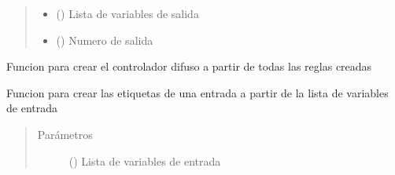 \documentclass[letterpaper,10pt,spanish]{sphinxmanual}
\begin{document}
\begin{fulllineitems}
\begin{fulllineitems}
\begin{quote}
\begin{description}
\begin{itemize}
\item {} 
 () \textendash{} Lista de variables de salida

\item {} 
 () \textendash{} Numero de salida

\end{itemize}

\end{description}\end{quote}

\end{fulllineitems}


\begin{fulllineitems}
\label{\detokenize{codigos/rutinas_fuzzy:rutinas_fuzzy.FuzzyController.crear_controlador}}
Funcion para crear el controlador difuso a partir de todas las reglas creadas

\end{fulllineitems}


\begin{fulllineitems}
\label{\detokenize{codigos/rutinas_fuzzy:rutinas_fuzzy.FuzzyController.crear_etiquetas_input}}
Funcion para crear las etiquetas de una entrada a partir de la lista de variables de entrada
\begin{quote}\begin{description}
\item[{Parámetros}] \leavevmode
{} () \textendash{} Lista de variables de entrada

\end{description}\end{quote}

\end{fulllineitems}


\end{fulllineitems}
\end{document}
